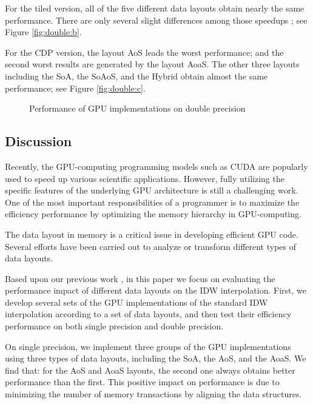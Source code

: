 For the tiled version, all of the five different data layouts obtain nearly the 
same performance. There are only several slight differences among those speedups 
; see Figure \ref{fig:double:b}.


For the CDP version, the layout AoS leads the worst performance; and the 
second worst results are generated by the layout AoaS. The other three 
layouts including the SoA, the SoAoS, and the Hybrid obtain almost the same 
performance; see Figure \ref{fig:double:c}.

\begin{figure}[htb]
\centering
{}
\hspace{1em}
\hspace{1em}
\caption{Performance of GPU implementations on double precision}
\label{fig:double}       \end{figure}

\subsection{Discussion}
\label{sec:discussion}

Recently, the GPU-computing programming models such as CUDA are popularly 
used to speed up various scientific applications. However, fully utilizing 
the specific features of the underlying GPU architecture is still a 
challenging work. One of the most important responsibilities of a programmer 
is to maximize the efficiency performance by optimizing the memory hierarchy 
in GPU-computing. 

The data layout in memory is a critical issue in developing efficient GPU 
code. Several efforts have been carried out to analyze \cite{giles2013,siegel2009,strzodka2012} or 
transform \cite{mistry2011,strzodka2011,sung2012} different types of data layouts.


Based upon our previous work \cite{mei2014}, in this paper we focus on evaluating 
the performance impact of different data layouts on the IDW interpolation. 
First, we develop several sets of the GPU implementations of the standard 
IDW interpolation according to a set of data layouts, and then test their 
efficiency performance on both single precision and double precision. 

On single precision, we implement three groups of the GPU implementations using three 
types of data layouts, including the SoA, the AoS, and the AoaS. We find that: 
for the AoS and AoaS layouts, the second one always obtains better 
performance than the first. This positive impact on performance is due to 
minimizing the number of memory transactions by aligning the data 
structures. 

